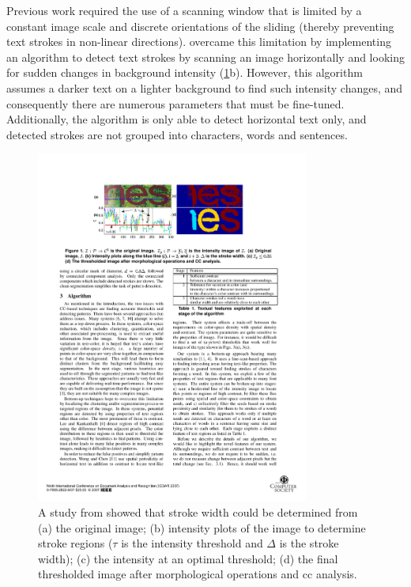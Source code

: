 Previous work required the use of a scanning window \citep{XiangrongChen:2004ha, Lienhart:2002ub, Jung:2009do} that is limited by a constant image scale and discrete orientations of the sliding (thereby preventing text strokes in non-linear directions). \citet{Subramanian:2007tf} overcame this limitation by implementing an algorithm to detect text strokes by scanning an image horizontally and looking for sudden changes in background intensity (\cref{fig:background:detection:cc:subramanian2007_intensity}b). However, this algorithm assumes a darker text on a lighter background to find such intensity changes, and consequently there are numerous parameters that must be fine-tuned. Additionally, the algorithm is only able to detect horizontal text only, and detected strokes are not grouped into characters, words and sentences.

\begin{figure}[h]
  \centering
  \includegraphics[width=0.8\textwidth]{images/background/subramanian2007_intensity}
  \caption[Stroke analysis from \citet{Subramanian:2007tf}]{A study from \citet{Subramanian:2007tf} showed that stroke width could be determined from (a) the original image; (b) intensity plots of the image to determine stroke regions ($\tau$ is the intensity threshold and $\Delta$ is the stroke width); (c) the intensity at an optimal threshold; (d) the final thresholded image after morphological operations and \gls{cc} analysis.}
  \label{fig:background:detection:cc:subramanian2007_intensity}
\end{figure}

